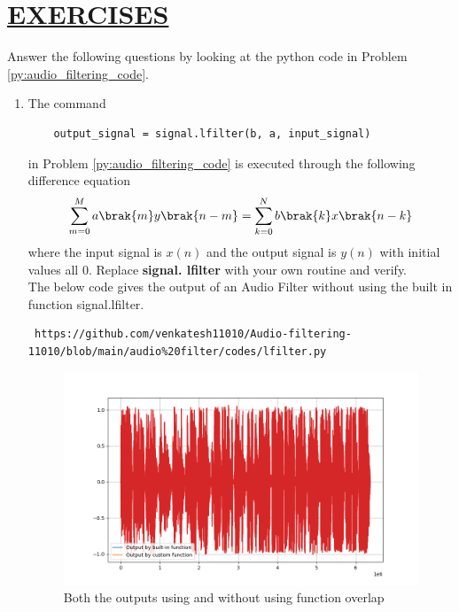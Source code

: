 \documentclass[journal,12pt,twocolumn]{IEEEtran}
\theoremstyle{remark}
\begin{document}
\section{\underline{\textbf{EXERCISES}}}
\noindent Answer the following questions by looking at the python code in Problem \ref{py:audio_filtering_code}.
\begin{enumerate}[label=\thesection.\arabic*]
\item
The command
\begin{lstlisting}
	output_signal = signal.lfilter(b, a, input_signal)
	\end{lstlisting}
in Problem \ref{py:audio_filtering_code} is executed through the following difference equation
\begin{equation}
\label{eq:iir_filter_gen}
 \sum _{m=0}^{M}a\brak{m}y\brak{n-m}=\sum _{k=0}^{N}b\brak{k}x\brak{n-k} 
\end{equation}
%
where the input signal is $x(n)$ and the output signal is $y(n)$ with initial values all 0. Replace
\textbf{signal. lfilter} with your own routine and verify.\\

\solution The below code gives the output of an Audio Filter without using the built in function signal.lfilter.
\begin{lstlisting}
 https://github.com/venkatesh11010/Audio-filtering-11010/blob/main/audio%20filter/codes/lfilter.py
\end{lstlisting}
\begin{figure}[!ht]
\centering
\includegraphics[width=1.2\columnwidth]{figs/lfilter.png}
\caption{Both the outputs using and without using function overlap}
\label{fig:6.1}
\end{figure}


\end{enumerate}
\end{document}
